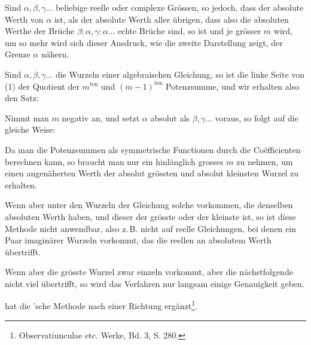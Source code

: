 Sind $\alpha, \beta, \gamma \ldots$ beliebige reelle oder complexe Grössen, so jedoch, dass der absolute Werth von $\alpha$  ist, als der absolute Werth aller übrigen, dass also die absoluten Werthe der Brüche $\beta:\alpha, \gamma:\alpha \ldots$ echte Brüche sind, so ist
und je grösser $m$ wird, um so mehr wird sich dieser Ausdruck, wie die zweite Darstellung zeigt, der Grenze $\alpha$ nähern.

Sind $\alpha, \beta, \gamma \ldots$ die Wurzeln einer algebraischen Gleichung, so ist die linke Seite von (1) der Quotient der $m^{\mathrm{ten}}$ und $(m-1)^{\mathrm{ten}}$ Potenzsumme, und wir erhalten also den Satz:

\begin{center}
\end{center}

Nimmt man $m$ negativ an, und setzt $\alpha$ absolut  als $\beta, \gamma \ldots$ voraus, so folgt auf die gleiche Weise:

\begin{center}
\end{center}

Da man die Potenzsummen als symmetrische Functionen durch die Coëfficienten berechnen kann, so braucht man nur ein hinlänglich grosses $m$ zu nehmen, um einen angenäherten Werth der absolut grössten und absolut kleinsten Wurzel zu erhalten.

Wenn aber unter den Wurzeln der Gleichung solche vorkommen, die denselben absoluten Werth haben, und dieser der grösste oder der kleinste ist, so ist diese Methode nicht anwendbar, also z.\,B. nicht auf reelle Gleichungen, bei denen ein Paar imaginärer Wurzeln vorkommt, das die reellen an absolutem Werth übertrifft.

Wenn aber die grösste Wurzel zwar einzeln vorkommt, aber die nächstfolgende nicht viel übertrifft, so wird das Verfahren nur langsam einige Genauigkeit geben.

 hat die 'sche Methode nach einer Richtung ergänzt\footnote{Observatiunculae etc. Werke, Bd. 3, S. 280.}.
